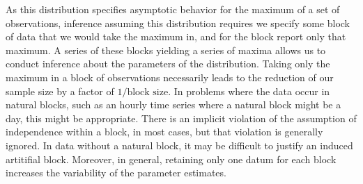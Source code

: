 As this distribution specifies asymptotic behavior for the maximum of a set of observations,
  inference assuming this distribution requires we specify some block of data that we would take the
  maximum in, and for the block report only that maximum.  A series of these blocks yielding a series
  of maxima allows us to conduct inference about the parameters of the distribution.  Taking only the
  maximum in a block of observations necessarily leads to the reduction of our sample size by a factor
  of $1/\text{block size}$. In problems where the data occur in natural blocks, such as an hourly time
  series where a natural block might be a day, this might be appropriate.  There is an implicit
  violation of the assumption of independence within a block, in most cases, but that violation is
  generally ignored. In data without a natural block, it may be difficult to justify an induced
  artitifial block. Moreover, in general, retaining only one
  datum for each block increases the variability of the parameter estimates.

